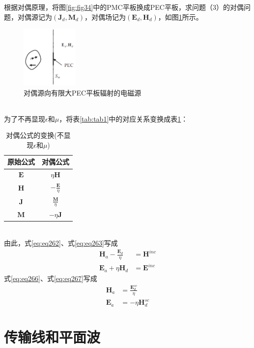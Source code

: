 \documentclass{article}
\numberwithin{equation}{section}
\begin{document}
\par
根据对偶原理，将图\ref{fig:fig34}中的PMC平板换成PEC平板，求问题（3）的对偶问题，对偶源记为$(\mathbf{J}_d,\mathbf{M}_d)$，对偶场记为$(\mathbf{E}_d,\mathbf{H}_d)$，如图\ref{fig:fig35}所示。
\begin{figure}[ht]
    \centering
    \includegraphics[width=0.25\textwidth]{对偶源向有限大PEC平板辐射的电磁源.PNG}
    \caption{对偶源向有限大PEC平板辐射的电磁源}
    \label{fig:fig35}
\end{figure}
\\
为了不再显现$\epsilon$和$\mu$，将表\ref{tab:tab1}中的对应关系变换成表\ref{tab:tab2}：
\begin{table}[!ht]
    \centering
    \caption{对偶公式的变换(不显现$\epsilon$和$\mu$)}
    \label{tab:tab2}
    \begin{tabular}{cc}
        \toprule
        原始公式 & 对偶公式 \\
        \midrule
        $\mathbf{E}$ & $\eta\mathbf{H}$ \\
        $\mathbf{H}$ & $-\frac{\mathbf{E}}{\eta}$ \\
        $\mathbf{J}$ & $\frac{\mathbf{M}}{\eta}$ \\
        $\mathbf{M}$ & $-\eta\mathbf{J}$ \\
        \bottomrule
     \end{tabular}
\end{table}
\\
由此，式\ref{eq:eq262}、式\ref{eq:eq263}写成
\begin{align}
    \label{eq:eq268}
    \mathbf{H}_a-\frac{\mathbf{E}_d}{\eta}&=\mathbf{H}^{inc} \\
    \label{eq:eq269}
    \mathbf{E}_a+\eta\mathbf{H}_d&=\mathbf{E}^{inc}
\end{align}
式\ref{eq:eq266}、式\ref{eq:eq267}写成
\begin{align}
    \label{eq:eq270}
    \mathbf{H}_a&=\frac{\mathbf{E}_d^{sc}}{\eta} \\
    \label{eq:eq271}
    \mathbf{E}_a&=-\eta\mathbf{H}_d^{sc}
\end{align}
\section{\textsf{传输线和平面波}}
\end{document}
